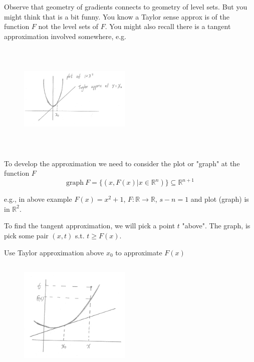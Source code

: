 \vspace{0.5cm}
Observe that geometry of gradients connects to geometry of level sets. But you might think that is a bit funny. You know a Taylor sense approx is of the function $F$ not the level sets of $F$. You might also recall there is a tangent approximation involved somewhere, e.g. 

\begin{figure}
	\centering
	\includegraphics[width=2.1in,height=2.1in]{figures/ch02/p62.jpg}
\end{figure}


To develop the approximation we need to consider the plot or "graph" at the function $F$
$$\text{graph}\ F = \{(x, F(x) | x \in \mathbb{R}^n)\} \subseteq \mathbb{R}^{n+1}$$

e.g., in above example $F(x) = x^2+1$, $F \colon \mathbb{R} \to \mathbb{R}$, $s-n=1$ and plot (graph) is in $\mathbb{R}^2$.

To find the tangent approximation, we will pick a point $t$ "above". The graph, is pick some pair $(x, t)$ s.t. $t \geq F(x)$.

Use Taylor approximation above $x_0$ to approximate $F(x)$ 

\begin{figure}
	\centering
	\includegraphics[width=2.1in,height=2.1in]{figures/ch02/p63.jpg}
\end{figure}

